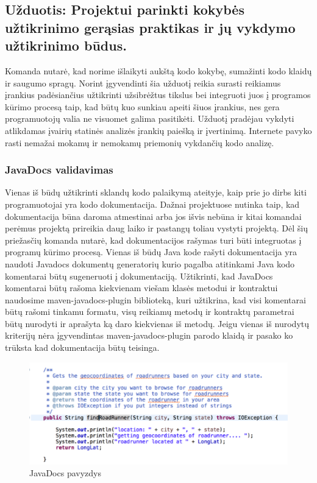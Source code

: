 \documentclass{VUMIFPSkursinis}
\begin{document}
		


	\subsection{Užduotis: Projektui parinkti kokybės užtikrinimo gerąsias praktikas ir jų vykdymo užtikrinimo būdus.}
		Komanda nutarė, kad norime išlaikyti aukštą kodo kokybę, sumažinti kodo klaidų ir saugumo spragų.
		Norint įgyvendinti šia užduotį reikia surasti reikiamus įrankius padėsiančius užtikrinti užsibrėžtus tikslus bei integruoti juos į programos kūrimo
		procesą taip, kad būtų kuo sunkiau apeiti šiuos įrankius, nes gera programuotojų valia ne visuomet galima pasitikėti.
		Užduotį pradėjau vykdyti atlikdamas įvairių statinės analizės įrankių paiešką ir įvertinimą.
		Internete pavyko rasti nemažai mokamų ir nemokamų priemonių vykdančių kodo analizę.
		
		\subsubsection{JavaDocs validavimas}
			Vienas iš būdų užtikrinti sklandų kodo palaikymą ateityje, kaip prie jo dirbs kiti programuotojai yra kodo dokumentacija.
			Dažnai projektuose nutinka taip, kad dokumentacija būna daroma atmestinai arba jos išvis nebūna ir kitai komandai perėmus projektą prireikia daug 
			laiko ir pastangų toliau vystyti projektą.
			Dėl šių priežasčių komanda nutarė, kad dokumentacijos rašymas turi būti integruotas į programų kūrimo procesą.
			Vienas iš būdų Java kode rašyti dokumentacija yra naudoti Javadocs dokumentų generatorių kurio pagalba atitinkami Java kodo komentarai būtų 
			sugeneruoti į dokumentaciją. 
			Užtikrinti, kad JavaDocs komentarai būtų rašoma kiekvienam viešam klasės metodui ir kontraktui naudosime  maven-javadocs-plugin biblioteką, kuri užtikrina, kad visi komentarai būtų rašomi tinkamu formatu, visų reikiamų metodų ir kontraktų parametrai būtų nurodyti ir aprašyta ką daro kiekvienas iš metodų.
			Jeigu vienas iš nurodytų kriterijų nėra įgyvendintas maven-javadocs-plugin parodo klaidą ir pasako ko trūksta kad dokumentacija būtų teisinga.
			\begin{figure}[H]
			\includegraphics[scale=0.7]{img/four}
			\caption{JavaDocs pavyzdys} %
			\label{img:kurimoProcesas}
			\end{figure}
\end{document}
